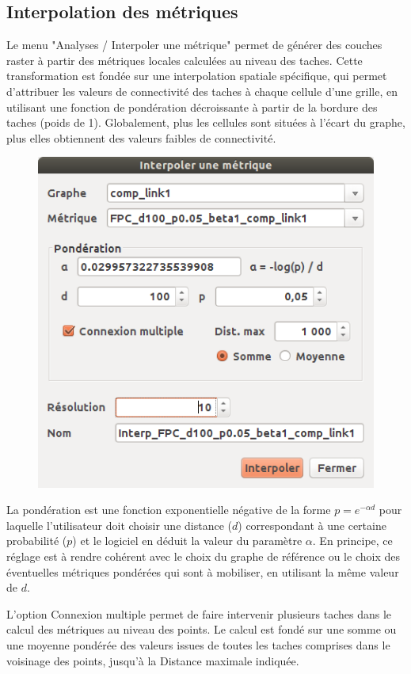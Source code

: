 \documentclass{article}
\begin{document}
\subsection{Interpolation des métriques}

Le menu "Analyses / Interpoler une métrique" permet de générer des couches raster à partir des métriques locales calculées au niveau des taches. Cette transformation est fondée sur une interpolation spatiale spécifique, qui permet d’attribuer les valeurs de connectivité des taches à chaque cellule d’une grille, en utilisant une fonction de pondération décroissante à partir de la bordure des taches (poids de 1). Globalement, plus les cellules sont situées à l’écart du graphe, plus elles obtiennent des valeurs faibles de connectivité.

\begin{figure}[H]
	\includegraphics[scale=0.5]{img/manual-fr_img12.png} 
\end{figure}

La pondération est une fonction exponentielle négative de la forme  $p={e}^{-\mathit{\alpha d}}$ pour laquelle l’utilisateur doit choisir une distance ($d$) correspondant à une certaine probabilité ($p$) et le logiciel en déduit la valeur du paramètre $\alpha$. En principe, ce réglage est à rendre cohérent avec le choix du graphe de référence ou le choix des éventuelles métriques pondérées qui sont à mobiliser, en utilisant la même valeur de $d$.

L’option Connexion multiple permet de faire intervenir plusieurs taches dans le calcul des métriques au niveau des points. Le calcul est fondé sur une somme ou une moyenne pondérée des valeurs issues de toutes les taches comprises dans le voisinage des points, jusqu’à la Distance maximale indiquée.
\end{document}
